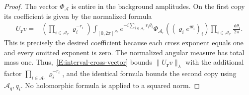 \documentclass[12pt,oneside,openany]{book}
\numberwithin{equation}{section}
\theoremstyle{nogostyle}
\theoremstyle{definition}
\newcommand{\ud}{\,\mathrm{d}}
\begin{document}
\begin{proof}
  

  The vector $\Phi_{\mathcal{A}}$ is entire in the background amplitudes. On the
  first copy its coefficient is given by the normalized formula
  \begin{equation}\label{E:split-vector-cauchy}
    \begin{split}
      U_{\boldsymbol r}v
      ={}&\left(\prod_{i\in\mathcal{A}_r}\varrho_i^{-r_i}\right)
      \int_{[0,2\pi]^{\mathcal{A}_r}}
      e^{-i\sum_{i\in\mathcal{A}_r}r_i\theta_i}
      \Phi_{\mathcal{A}_r}((\varrho_i e^{i\theta_i})_i)
      \prod_{i\in\mathcal{A}_r}\frac{\ud\theta_i}{2\pi}.
    \end{split}
  \end{equation}
  This is precisely the desired coefficient because each cross exponent equals
  one and every omitted exponent is zero. The normalized angular measure has
  total mass one. Thus,~\eqref{E:interval-cross-vector} bounds $\|U_{\boldsymbol
  r}v\|_\lambda$ with the additional factor
  $\prod_{i\in\mathcal{A}_r}\varrho_i^{-r_i}$, and the identical formula bounds
  the second copy using $\mathcal{A}_q,q_i$. No holomorphic formula is applied
  to a squared norm.



\end{proof}
\end{document}
